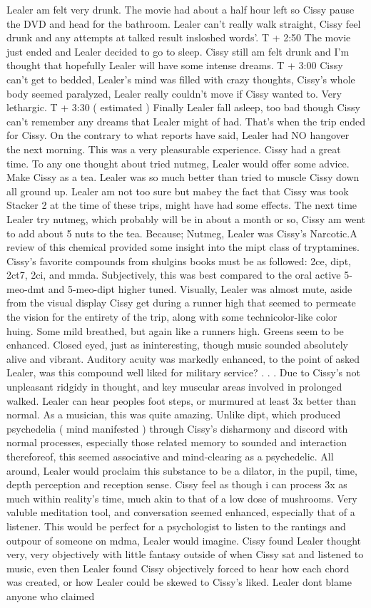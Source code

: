 \documentclass[12pt]{book}
\begin{document}
Lealer am felt very drunk. The movie had about a half hour left so Cissy pause the DVD and head for the bathroom. Lealer can't really walk straight, Cissy feel drunk and any attempts at talked result insloshed words'. T + 2:50 The movie just ended and Lealer decided to go to sleep. Cissy still am felt drunk and I'm thought that hopefully Lealer will have some intense dreams. T + 3:00 Cissy can't get to bedded, Lealer's mind was filled with crazy thoughts, Cissy's whole body seemed paralyzed, Lealer really couldn't move if Cissy wanted to. Very lethargic. T + 3:30 ( estimated ) Finally Lealer fall asleep, too bad though Cissy can't remember any dreams that Lealer might of had. That's when the trip ended for Cissy. On the contrary to what reports have said, Lealer had NO hangover the next morning. This was a very pleasurable experience. Cissy had a great time. To any one thought about tried nutmeg, Lealer would offer some advice. Make Cissy as a tea. Lealer was so much better than tried to muscle Cissy down all ground up. Lealer am not too sure but mabey the fact that Cissy was took Stacker 2 at the time of these trips, might have had some effects. The next time Lealer try nutmeg, which probably will be in about a month or so, Cissy am went to add about 5 nuts to the tea. Because; Nutmeg, Lealer was Cissy's Narcotic.A review of this chemical provided some insight into the mipt class of tryptamines. Cissy's favorite compounds from shulgins books must be as followed: 2ce, dipt, 2ct7, 2ci, and mmda. Subjectively, this was best compared to the oral active 5-meo-dmt and 5-meo-dipt higher tuned. Visually, Lealer was almost mute, aside from the visual display Cissy get during a runner high that seemed to permeate the vision for the entirety of the trip, along with some technicolor-like color huing. Some mild breathed, but again like a runners high. Greens seem to be enhanced. Closed eyed, just as ininteresting, though music sounded absolutely alive and vibrant. Auditory acuity was markedly enhanced, to the point of asked Lealer, was this compound well liked for military service?  . . .  Due to Cissy's not unpleasant ridgidy in thought, and key muscular areas involved in prolonged walked. Lealer can hear peoples foot steps, or murmured at least 3x better than normal. As a musician, this was quite amazing. Unlike dipt, which produced psychedelia (  mind manifested  ) through Cissy's disharmony and discord with normal processes, especially those related memory to sounded and interaction thereforeof, this seemed associative and mind-clearing as a psychedelic. All around, Lealer would proclaim this substance to be a dilator, in the pupil, time, depth perception and reception sense. Cissy feel as though i can process 3x as much within reality's time, much akin to that of a low dose of mushrooms. Very valuble meditation tool, and conversation seemed enhanced, especially that of a listener. This would be perfect for a psychologist to listen to the rantings and outpour of someone on mdma, Lealer would imagine. Cissy found Lealer thought very, very objectively with little fantasy outside of when Cissy sat and listened to music, even then Lealer found Cissy objectively forced to hear how each chord was created, or how Lealer could be skewed to Cissy's liked. Lealer dont blame anyone who claimed 
\end{document}
